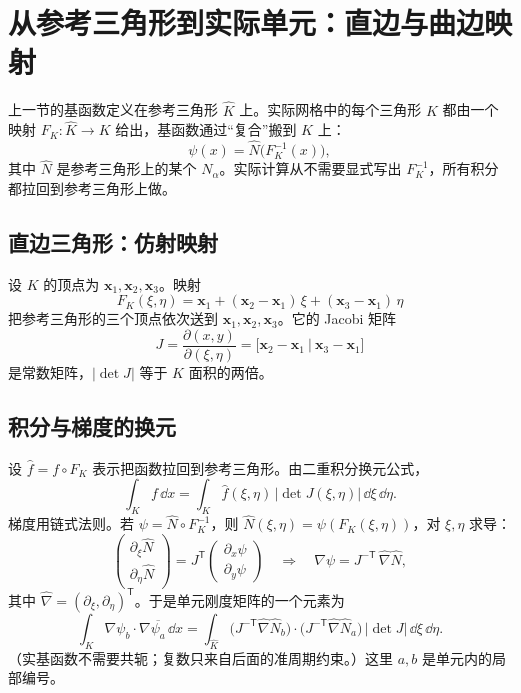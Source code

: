 \documentclass[11pt,a4paper,fontset=fandol]{ctexart}
\begin{document}
\section{从参考三角形到实际单元：直边与曲边映射}
\label{sec:mapping}

上一节的基函数定义在参考三角形 $\widehat K$ 上。实际网格中的每个三角形 $K$ 都由一个映射 $F_K:\widehat K\to K$ 给出，基函数通过“复合”搬到 $K$ 上：
\[
\psi(x)=\widehat N\bigl(F_K^{-1}(x)\bigr),
\]
其中 $\widehat N$ 是参考三角形上的某个 $N_\alpha$。实际计算从不需要显式写出 $F_K^{-1}$，所有积分都拉回到参考三角形上做。

\subsection{直边三角形：仿射映射}

设 $K$ 的顶点为 $\bm x_1,\bm x_2,\bm x_3$。映射
\[
F_K(\xi,\eta)=\bm x_1+(\bm x_2-\bm x_1)\,\xi+(\bm x_3-\bm x_1)\,\eta
\]
把参考三角形的三个顶点依次送到 $\bm x_1,\bm x_2,\bm x_3$。它的 Jacobi 矩阵
\[
J=\frac{\partial(x,y)}{\partial(\xi,\eta)}=\bigl[\bm x_2-\bm x_1\ \big|\ \bm x_3-\bm x_1\bigr]
\]
是常数矩阵，$|\det J|$ 等于 $K$ 面积的两倍。

\subsection{积分与梯度的换元}

设 $\widehat f=f\circ F_K$ 表示把函数拉回到参考三角形。由二重积分换元公式，
\begin{equation}
\label{eq:change-var}
\int_K f\,\dd x=\int_{\widehat K}\widehat f(\xi,\eta)\,|\det J(\xi,\eta)|\,\dd\xi\,\dd\eta .
\end{equation}
梯度用链式法则。若 $\psi=\widehat N\circ F_K^{-1}$，则 $\widehat N(\xi,\eta)=\psi(F_K(\xi,\eta))$，对 $\xi,\eta$ 求导：
\[
\begin{pmatrix}\partial_\xi\widehat N\\ \partial_\eta\widehat N\end{pmatrix}
=J^{\mathsf T}\begin{pmatrix}\partial_x\psi\\ \partial_y\psi\end{pmatrix}
\quad\Longrightarrow\quad
\nabla\psi=J^{-\mathsf T}\,\widehat\nabla\widehat N ,
\]
其中 $\widehat\nabla=(\partial_\xi,\partial_\eta)^{\mathsf T}$。于是单元刚度矩阵的一个元素为
\begin{equation}
\label{eq:local-K}
\int_K\nabla\psi_b\cdot\nabla\overline{\psi_a}\,\dd x
=\int_{\widehat K}\bigl(J^{-\mathsf T}\widehat\nabla\widehat N_b\bigr)\cdot\bigl(J^{-\mathsf T}\widehat\nabla\widehat N_a\bigr)\,|\det J|\,\dd\xi\,\dd\eta .
\end{equation}
（实基函数不需要共轭；复数只来自后面的准周期约束。）这里 $a,b$ 是单元内的局部编号。
\end{document}
